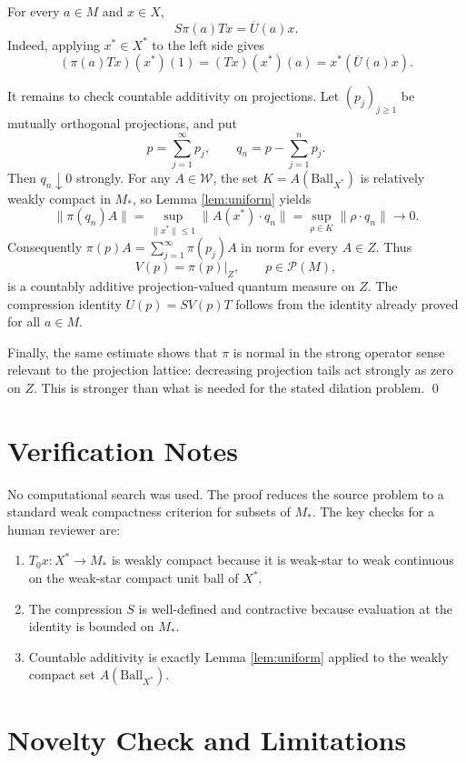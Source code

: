\documentclass[11pt]{article}
\newcommand{\cP}{\mathcal P}
\newcommand{\cW}{\mathcal W}
\newcommand{\Ball}{\mathrm{Ball}}
\begin{document}
For every \(a\in M\) and \(x\in X\),
\[
        S\pi(a)Tx=\overline U(a)x.
\]
Indeed, applying \(x^*\in X^*\) to the left side gives
\[
        (\pi(a)Tx)(x^*)(1)=(Tx)(x^*)(a)=x^*(\overline U(a)x).
\]

It remains to check countable additivity on projections.  Let
\((p_j)_{j\geq1}\) be mutually orthogonal projections, and put
\[
        p=\sum_{j=1}^\infty p_j,\qquad
        q_n=p-\sum_{j=1}^n p_j .
\]
Then \(q_n\downarrow0\) strongly.  For any \(A\in\cW\), the set
\(K=A(\Ball_{X^*})\) is relatively weakly compact in \(M_*\), so Lemma
\ref{lem:uniform} yields
\[
        \|\pi(q_n)A\|
        =\sup_{\|x^*\|\leq1}\|A(x^*)\cdot q_n\|
        =\sup_{\rho\in K}\|\rho\cdot q_n\|\longrightarrow0.
\]
Consequently \(\pi(p)A=\sum_{j=1}^{\infty}\pi(p_j)A\) in norm for every
\(A\in Z\).  Thus
\[
        V(p)=\pi(p)|_Z,\qquad p\in\cP(M),
\]
is a countably additive projection-valued quantum measure on \(Z\).  The
compression identity \(U(p)=S V(p)T\) follows from the identity already proved
for all \(a\in M\).

Finally, the same estimate shows that \(\pi\) is normal in the strong operator
sense relevant to the projection lattice: decreasing projection tails act
strongly as zero on \(Z\).  This is stronger than what is needed for the stated
dilation problem.
\qed

\section*{Verification Notes}

No computational search was used.  The proof reduces the source problem to a
standard weak compactness criterion for subsets of \(M_*\).  The key checks for a
human reviewer are:
\begin{enumerate}[leftmargin=*]
\item \(T_0x:X^*\to M_*\) is weakly compact because it is weak-star to weak
continuous on the weak-star compact unit ball of \(X^*\).
\item The compression \(S\) is well-defined and contractive because evaluation at
the identity is bounded on \(M_*\).
\item Countable additivity is exactly Lemma \ref{lem:uniform} applied to the
weakly compact set \(A(\Ball_{X^*})\).
\end{enumerate}

\section*{Novelty Check and Limitations}
\end{document}
